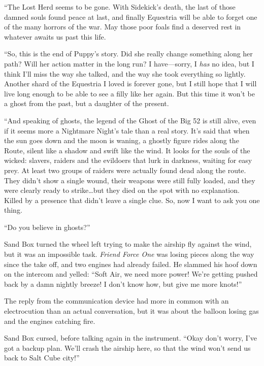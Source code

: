 {``The Lost Herd seems to be gone. With Sidekick's death, the last of those damned souls found peace at last, and finally Equestria will be able to forget one of the many horrors of the war. May those poor foals find a deserved rest in whatever awaits us past this life.

``So, this is the end of Puppy's story. Did she really change something along her path? Will her action matter in the long run? I have---sorry, I \emph{has}\/ no idea, but I think I'll miss the way she talked, and the way she took everything so lightly. Another shard of the Equestria I loved is forever gone, but I still hope that I will live long enough to be able to see a filly like her again. But this time it won't be a ghost from the past, but a daughter of the present.

``And speaking of ghosts, the legend of the Ghost of the Big 52 is still alive, even if it seems more a Nightmare Night's tale than a real story. It's said that when the sun goes down and the moon is waning, a ghostly figure rides along the Route, silent like a shadow and swift like the wind. It looks for the souls of the wicked: slavers, raiders and the evildoers that lurk in darkness, waiting for easy prey. At least two groups of raiders were actually found dead along the route. They didn't show a single wound, their weapons were still fully loaded, and they were clearly ready to strike\dots but they died on the spot with no explanation. Killed by a presence that didn't leave a single clue. So, now I want to ask you one thing.

``Do you believe in ghosts?''

}

\horizonline


Sand Box turned the wheel left trying to make the airship fly against the wind, but it was an impossible task. \emph{Friend Force One}\/ was losing pieces along the way since the take off, and two engines had already failed. He slammed his hoof down on the intercom and yelled: ``Soft Air, we need more power! We're getting pushed back by a damn nightly breeze! I don't know how, but give me more knots!''

The reply from the communication device had more in common with an electrocution than an actual conversation, but it was about the balloon losing gas and the engines catching fire.

Sand Box cursed, before talking again in the instrument. ``Okay don't worry, I've got a backup plan. We'll crash the airship here, so that the wind won't send us back to Salt Cube city!''

